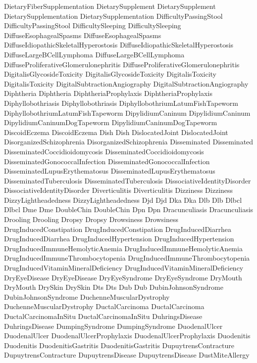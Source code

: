  DietaryFiberSupplementation
 DietarySupplement
 DietarySupplement
 DietarySupplementation
 DietarySupplementation
 DifficultyPassingStool
 DifficultyPassingStool
 DifficultySleeping
 DifficultySleeping
 DiffuseEsophagealSpasms
 DiffuseEsophagealSpasms
 DiffuseIdiopathicSkeletalHyperostosis
 DiffuseIdiopathicSkeletalHyperostosis
 DiffuseLargeBCellLymphoma
 DiffuseLargeBCellLymphoma
 DiffuseProliferativeGlomerulonephritis
 DiffuseProliferativeGlomerulonephritis
 DigitalisGlycosideToxicity
 DigitalisGlycosideToxicity
 DigitalisToxicity
 DigitalisToxicity
 DigitalSubtractionAngiography
 DigitalSubtractionAngiography
 Diphtheria
 Diphtheria
 DiphtheriaProphylaxis
 DiphtheriaProphylaxis
 Diphyllobothriasis
 Diphyllobothriasis
 DiphyllobothriumLatumFishTapeworm
 DiphyllobothriumLatumFishTapeworm
 DipylidiumCaninum
 DipylidiumCaninum
 DipylidiumCaninumDogTapeworm
 DipylidiumCaninumDogTapeworm
 DiscoidEczema
 DiscoidEczema
 Dish
 Dish
 DislocatedJoint
 DislocatedJoint
 DisorganizedSchizophrenia
 DisorganizedSchizophrenia
 Disseminated
 Disseminated
 DisseminatedCoccidioidomycosis
 DisseminatedCoccidioidomycosis
 DisseminatedGonococcalInfection
 DisseminatedGonococcalInfection
 DisseminatedLupusErythematosus
 DisseminatedLupusErythematosus
 DisseminatedTuberculosis
 DisseminatedTuberculosis
 DissociativeIdentityDisorder
 DissociativeIdentityDisorder
 Diverticulitis
 Diverticulitis
 Dizziness
 Dizziness
 DizzyLightheadedness
 DizzyLightheadedness
 Djd
 Djd
 Dka
 Dka
 Dlb
 Dlb
 Dlbcl
 Dlbcl
 Dme
 Dme
 DoubleChin
 DoubleChin
 Dpn
 Dpn
 Dracunculiasis
 Dracunculiasis
 Drooling
 Drooling
 Dropsy
 Dropsy
 Drowsiness
 Drowsiness
 DrugInducedConstipation
 DrugInducedConstipation
 DrugInducedDiarrhea
 DrugInducedDiarrhea
 DrugInducedHypertension
 DrugInducedHypertension
 DrugInducedImmuneHemolyticAnemia
 DrugInducedImmuneHemolyticAnemia
 DrugInducedImmuneThrombocytopenia
 DrugInducedImmuneThrombocytopenia
 DrugInducedVitaminMineralDeficiency
 DrugInducedVitaminMineralDeficiency
 DryEyeDisease
 DryEyeDisease
 DryEyeSyndrome
 DryEyeSyndrome
 DryMouth
 DryMouth
 DrySkin
 DrySkin
 Dts
 Dts
 Dub
 Dub
 DubinJohnsonSyndrome
 DubinJohnsonSyndrome
 DuchenneMuscularDystrophy
 DuchenneMuscularDystrophy
 DuctalCarcinoma
 DuctalCarcinoma
 DuctalCarcinomaInSitu
 DuctalCarcinomaInSitu
 DuhringsDisease
 DuhringsDisease
 DumpingSyndrome
 DumpingSyndrome
 DuodenalUlcer
 DuodenalUlcer
 DuodenalUlcerProphylaxis
 DuodenalUlcerProphylaxis
 Duodenitis
 Duodenitis
 DuodenitisGastritis
 DuodenitisGastritis
 DupuytrensContracture
 DupuytrensContracture
 DupuytrensDisease
 DupuytrensDisease
 DustMiteAllergy
